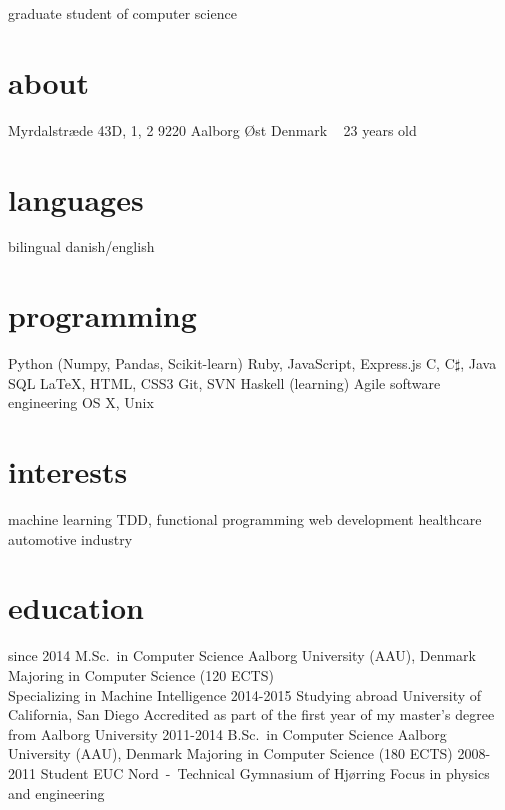 \documentclass{afriggeri-cv/friggeri-cv}
\newcommand{\aau}{%
  Aalborg University (AAU), Denmark
}
\begin{document}
       {graduate student of computer science}

\begin{aside}
  \section{about}
    Myrdalstræde 43D, 1, 2
    9220 Aalborg Øst
    Denmark
    ~
    23 years old
  \section{languages}
    bilingual danish/english
  \section{programming}
    Python (Numpy, Pandas, Scikit-learn)
    Ruby, JavaScript, Express.js
    C, C$\sharp$, Java
    SQL
    \LaTeX, HTML, CSS3
    Git, SVN
    Haskell (learning)
    Agile software engineering
    OS X, Unix
  \section{interests}
    machine learning
    TDD, functional programming
    web development
    healthcare
    automotive industry
\end{aside}

\section{education}

\begin{entrylist}
  \entry
    {since 2014}
    {M.Sc.\ {\normalfont in Computer Science}}
    {\aau}
    {Majoring in Computer Science (120 ECTS)\\
    Specializing in Machine Intelligence}
  \entry
    {2014-2015}
    {Studying abroad}
    {University of California, San Diego}
    {Accredited as part of the first year of my master's degree from Aalborg University}
  \entry
    {2011-2014}
    {B.Sc.\ {\normalfont in Computer Science}}
    {\aau}
    {Majoring in Computer Science (180 ECTS)}
  \entry
    {2008-2011}
    {Student}
    {EUC Nord~-~Technical Gymnasium of Hjørring}
    {Focus in physics and engineering}
\end{entrylist}
\end{document}
